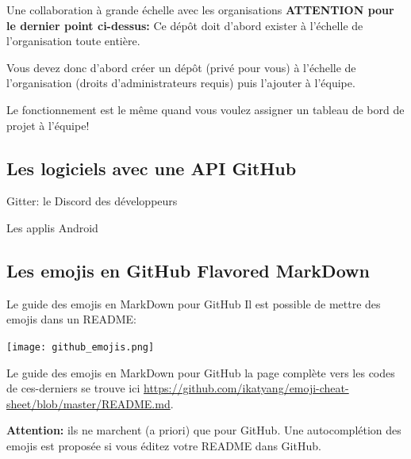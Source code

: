 \documentclass{beamer}
\begin{document}
\begin{frame}{Une collaboration à grande échelle avec les organisations}
\textbf{ATTENTION pour le dernier point ci-dessus:} Ce dépôt doit d'abord exister à l'échelle de l'organisation toute entière.\\
\medskip

Vous devez donc d'abord créer un dépôt (privé pour vous) à l'échelle de l'organisation (droits d'administrateurs requis) puis l'ajouter à l'équipe.\\
\medskip

Le fonctionnement est le même quand vous voulez assigner un tableau de bord de projet à l'équipe!
\end{frame}


\subsection{Les logiciels avec une API GitHub}
\begin{frame}{Gitter: le Discord des développeurs}

\end{frame}

\begin{frame}{Les applis Android}

\end{frame}


\subsection{Les emojis en GitHub Flavored MarkDown}
\begin{frame}{Le guide des emojis en MarkDown pour GitHub}
Il est possible de mettre des emojis dans un README: 
\begin{center}
	\texttt{[image: github\_emojis.png]}
\end{center}
\end{frame}

\begin{frame}{Le guide des emojis en MarkDown pour GitHub}
la page complète vers les codes de ces-derniers se trouve ici \url{https://github.com/ikatyang/emoji-cheat-sheet/blob/master/README.md}.\\
\medskip
 
\textbf{Attention:} ils ne marchent (a priori) que pour GitHub. Une autocomplétion des emojis est proposée si vous éditez votre README dans GitHub.
\end{frame}
\end{document}
